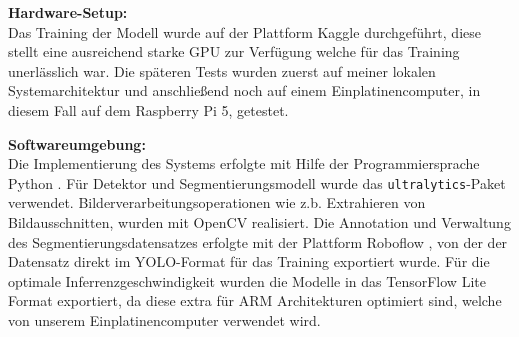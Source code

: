 \textbf{Hardware-Setup:} \\
Das Training der Modell wurde auf der Plattform Kaggle durchgeführt, diese stellt eine ausreichend starke GPU zur Verfügung welche für das Training unerlässlich war. Die späteren Tests wurden zuerst auf meiner lokalen Systemarchitektur und anschließend noch auf einem Einplatinencomputer, in diesem Fall auf dem Raspberry Pi 5, getestet.

\textbf{Softwareumgebung:} \\
Die Implementierung des Systems erfolgte mit Hilfe der Programmiersprache Python \cite{van1995python}. Für Detektor und Segmentierungsmodell wurde das \texttt{ultralytics}-Paket verwendet. Bilderverarbeitungsoperationen wie z.b. Extrahieren von Bildausschnitten, wurden mit OpenCV \cite{bradski2000opencv} realisiert. Die Annotation und Verwaltung des Segmentierungsdatensatzes erfolgte mit der Plattform Roboflow \cite{roboflow2025}, von der der Datensatz direkt im YOLO-Format für das Training exportiert wurde. Für die optimale Inferrenzgeschwindigkeit wurden die Modelle in das TensorFlow Lite \cite{abadi2016tensorflow} Format exportiert, da diese extra für ARM \cite{arm2026architecture} Architekturen optimiert sind, welche von unserem Einplatinencomputer verwendet wird.
